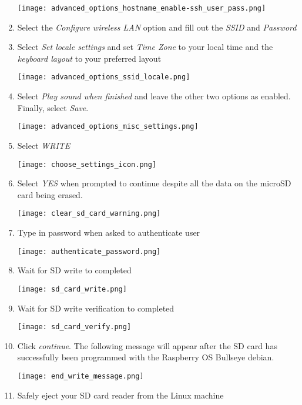 \documentclass[journal]{IEEEtran}
\begin{document}
\begin{enumerate}
        \texttt{[image: advanced\_options\_hostname\_enable-ssh\_user\_pass.png]}

        \item Select the \emph{Configure wireless LAN} option and fill out the \emph{SSID} and \emph{Password}
        
        \item Select \emph{Set locale settings} and set \emph{Time Zone} to your local time and the \emph{keyboard layout} to your preferred layout
        
        \texttt{[image: advanced\_options\_ssid\_locale.png]}

        \item Select \emph{Play sound when finished} and leave the other two options as enabled. Finally, select \emph{Save}.
        
        \texttt{[image: advanced\_options\_misc\_settings.png]}

        \item Select \emph{WRITE} 
        
        \texttt{[image: choose\_settings\_icon.png]}

        \item Select \emph{YES} when prompted to continue despite all the data on the microSD card being erased.
        
        \texttt{[image: clear\_sd\_card\_warning.png]}

        \item Type in password when asked to authenticate user
        
        \texttt{[image: authenticate\_password.png]}

        \item Wait for SD write to completed
        
        \texttt{[image: sd\_card\_write.png]}

        \item Wait for SD write verification to completed
        
        \texttt{[image: sd\_card\_verify.png]}

        \item Click \emph{continue}. The following message will appear after the SD card has successfully been programmed with the Raspberry OS Bullseye debian.
        
        \texttt{[image: end\_write\_message.png]}

        \item Safely eject your SD card reader from the Linux machine 

    \end{enumerate}
\end{document}
